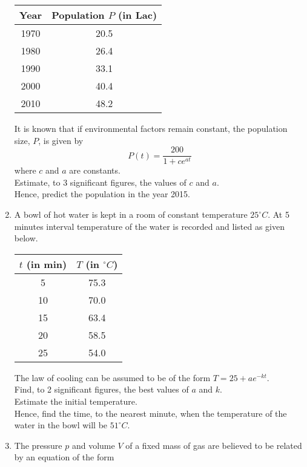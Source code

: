 \documentclass[12pt,class=book,crop=false]{standalone}
\begin{document}
\begin{enumerate}
\begin{table}[H]
		      \centering
		      \begin{tabular}{cc}
			      \toprule
			      Year                      & 
				  Population $ P $ (in Lac) \\\midrule
				  1970 &
				  20.5 \\
				   1980 &
				   26.4 \\
				    1990 &
					33.1 \\
					 2000 &
					 40.4 \\
					  2010 &
					   48.2 \\\bottomrule
		      \end{tabular}
	      \end{table}
	      It is known that if environmental factors remain constant, the population size,  $ P $,  is given by
	      \[
		      P(t)=\frac{200}{1+c e^{at}}
	      \]
	      where $ c $ and $ a $ are constants.\\
	      Estimate, to 3 significant figures, the values of $ c $ and $ a $.\\
	      Hence, predict the population in the year 2015.
	\item A bowl of hot water is kept in a room of constant temperature $ 25^\circ C $. At 5 minutes interval temperature of the water is recorded and listed as given below.
	      \begin{table}[H]
		      \centering
		      \begin{tabular}{cc}
			      \toprule
			      $ t $ (in min)            &
				  $ T $ (in $ {}^\circ C $) \\\midrule
				   5    &
				   75.3 \\
				    10   &
					70.0 \\
					 15   &
					 63.4 \\
					  20   &
					  58.5 \\
					   25   &
					   54.0 \\\hline
		      \end{tabular}
	      \end{table}
	      The law of cooling can be assumed to be of the form	$ T=25+ae^{-kt} $.\\
	      Find, to 2 significant figures, the best values of $ a $ and $ k $.\\
	      Estimate the initial temperature.\\
	      Hence, find the time, to the nearest minute, when the temperature of the water in the bowl will be  $ 51^\circ C $.
	\item The pressure $ p $ and volume $ V $ of a fixed mass of gas are believed to be related by an equation of the form

\end{enumerate}
\end{document}
